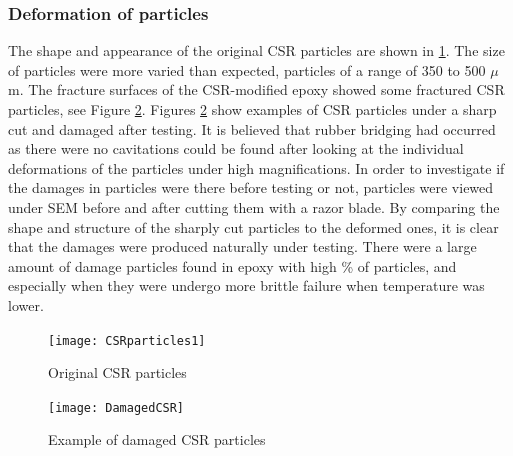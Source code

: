 \documentclass[numbers=noendperiod,chapterprefix=on]{icldt} %
\begin{document}
{\subsubsection{Deformation of particles}
The shape and appearance of the original CSR particles are shown in  \ref{CSRparticles1}. The size of particles were more varied than expected, particles of a range of 350 to 500 $ \mu $m. The fracture surfaces of the CSR-modified epoxy showed some fractured CSR particles, see Figure  \ref{DamagedCSR}. Figures %
\ref{DamagedCSR} show examples of CSR particles under a sharp cut and damaged after testing. It is believed that rubber bridging had occurred as there were no cavitations could be found after looking at the individual deformations of the particles under high magnifications. In order to investigate if the damages in particles were there before testing or not, particles were viewed under SEM before and after cutting them with a razor blade. By comparing the shape and structure of the sharply cut particles to the deformed ones, it is clear that the damages were produced naturally under testing. There were a large amount of damage particles found in epoxy with high \% of particles, and especially when they were undergo more brittle failure when temperature was lower.

\begin{figure}[!htpb]
\centering
\texttt{[image: CSRparticles1]} 
\caption{Original CSR particles}\label{CSRparticles1}
\end{figure}
\FloatBarrier


\begin{figure}[!htpb]
\centering
\texttt{[image: DamagedCSR]}
\caption{Example of damaged CSR particles} \label{DamagedCSR}
\end{figure}
\FloatBarrier

}
\end{document}
